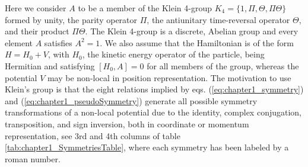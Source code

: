 Here we consider
$A$ to be a member of the
Klein 4-group $K_4=\{1,\Pi, \Theta, \Pi\Theta\}$ formed by unity, the parity operator $\Pi$, the antiunitary time-reversal operator $\Theta$, and their product
$\Pi\Theta$. The Klein 4-group is a discrete, Abelian group and every element $A$ satisfies $A^2 = 1$. We also assume that the  Hamiltonian is  of the form $H=H_0+V$, with $H_0$, the kinetic energy operator of the particle,
being Hermitian and
satisfying $[H_0,A]=0$ for all members of the group, whereas the potential $V$ may be non-local in position representation.
The  motivation to use Klein's group is that the eight relations implied by eqs. (\ref{eq:chapter1_symmetry}) and (\ref{eq:chapter1_pseudoSymmetry}) generate all
possible symmetry transformations of a non-local potential due to the identity, complex conjugation, transposition, and sign inversion,
both in coordinate or momentum representation, see 3rd and 4th columns of table \ref{tab:chapter1_SymmetriesTable}, where each symmetry has been labeled by a roman number.

